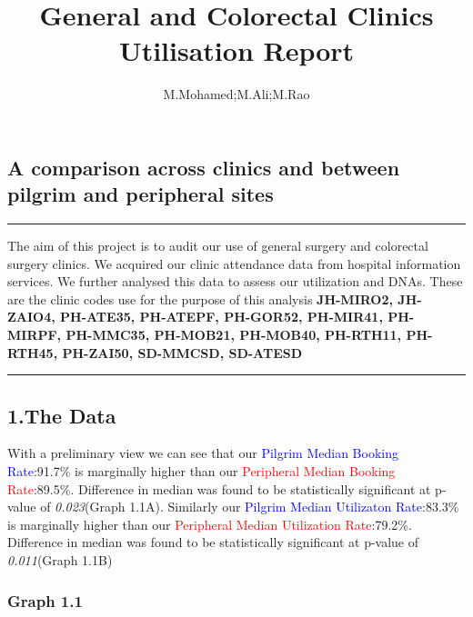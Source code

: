 \documentclass[]{article}
\title{General and Colorectal Clinics Utilisation Report}
\author{M.Mohamed;M.Ali;M.Rao}
\date{}
\begin{document}
\maketitle

{
\setcounter{tocdepth}{2}
\tableofcontents
}
\hypertarget{a-comparison-across-clinics-and-between-pilgrim-and-peripheral-sites}{%
\subsection{A comparison across clinics and between pilgrim and
peripheral
sites}\label{a-comparison-across-clinics-and-between-pilgrim-and-peripheral-sites}}

\begin{center}\rule{0.5\linewidth}{0.5pt}\end{center}

The aim of this project is to audit our use of general surgery and
colorectal surgery clinics. We acquired our clinic attendance data from
hospital information services. We further analysed this data to assess
our utilization and DNAs. These are the clinic codes use for the purpose
of this analysis \textbf{JH-MIRO2, JH-ZAIO4, PH-ATE35, PH-ATEPF,
PH-GOR52, PH-MIR41, PH-MIRPF, PH-MMC35, PH-MOB21, PH-MOB40, PH-RTH11,
PH-RTH45, PH-ZAI50, SD-MMCSD, SD-ATESD}

\begin{center}\rule{0.5\linewidth}{0.5pt}\end{center}

\newpage

\hypertarget{the-data}{%
\subsection{1.The Data}\label{the-data}}

With a preliminary view we can see that our \textcolor{blue}{Pilgrim
Median Booking Rate}:91.7\% is marginally higher than our
\textcolor{red}{Peripheral Median Booking Rate}:89.5\%. Difference in
median was found to be statistically significant at p-value of
\emph{0.023}(Graph 1.1A). Similarly our \textcolor{blue}{Pilgrim Median
Utilizaton Rate}:83.3\% is marginally higher than our
\textcolor{red}{Peripheral Median Utilization Rate}:79.2\%. Difference
in median was found to be statistically significant at p-value of
\emph{0.011}(Graph 1.1B)

\hypertarget{graph-1.1}{%
\subsubsection{Graph 1.1}\label{graph-1.1}}
\end{document}

